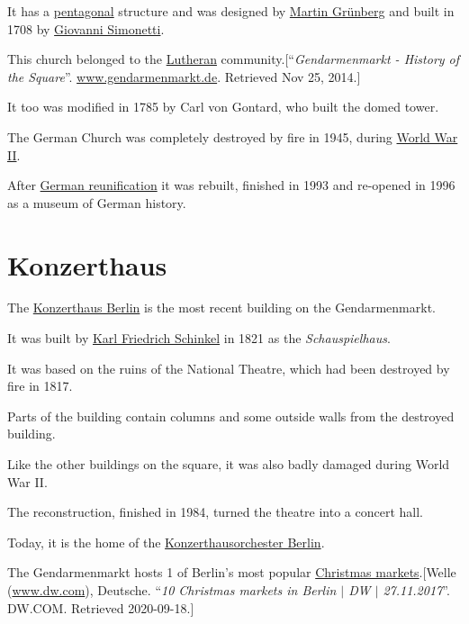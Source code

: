 \documentclass{book}
\numberwithin{equation}{section}
\begin{document}
It has a \href{https://en.wikipedia.org/wiki/Pentagonal}{pentagonal} structure and was designed by \href{https://en.wikipedia.org/wiki/Martin_Gr%C3%BCnberg}{Martin Grünberg} and built in 1708 by \href{https://en.wikipedia.org/wiki/Giovanni_Simonetti}{Giovanni Simonetti}.
    
This church belonged to the \href{https://en.wikipedia.org/wiki/Lutheran}{Lutheran} community.[``\textit{Gendarmenmarkt - History of the Square}''. \url{www.gendarmenmarkt.de}. Retrieved Nov 25, 2014.]

It too was modified in 1785 by Carl von Gontard, who built the domed tower.

The German Church was completely destroyed by fire in 1945, during \href{https://en.wikipedia.org/wiki/World_War_II}{World War II}.

After \href{https://en.wikipedia.org/wiki/German_reunification}{German reunification} it was rebuilt, finished in 1993 and re-opened in 1996 as a museum of German history.

\section{Konzerthaus}
The \href{https://en.wikipedia.org/wiki/Konzerthaus_Berlin}{Konzerthaus Berlin} is the most recent building on the Gendarmenmarkt.

It was built by \href{https://en.wikipedia.org/wiki/Karl_Friedrich_Schinkel}{Karl Friedrich Schinkel} in 1821 as the \textit{Schauspielhaus}.

It was based on the ruins of the National Theatre, which had been destroyed by fire in 1817.

Parts of the building contain columns and some outside walls from the destroyed building.

Like the other buildings on the square, it was also badly damaged during World War II.

The reconstruction, finished in 1984, turned the theatre into a concert hall.

Today, it is the home of the \href{https://en.wikipedia.org/wiki/Konzerthausorchester_Berlin}{Konzerthausorchester Berlin}.

%
The Gendarmenmarkt hosts 1 of Berlin's most popular \href{https://en.wikipedia.org/wiki/Christmas_market}{Christmas markets}.[Welle (\url{www.dw.com}), Deutsche. ``\textit{10 Christmas markets in Berlin $|$ DW $|$ 27.11.2017}''. DW.COM. Retrieved 2020-09-18.]
\end{document}
